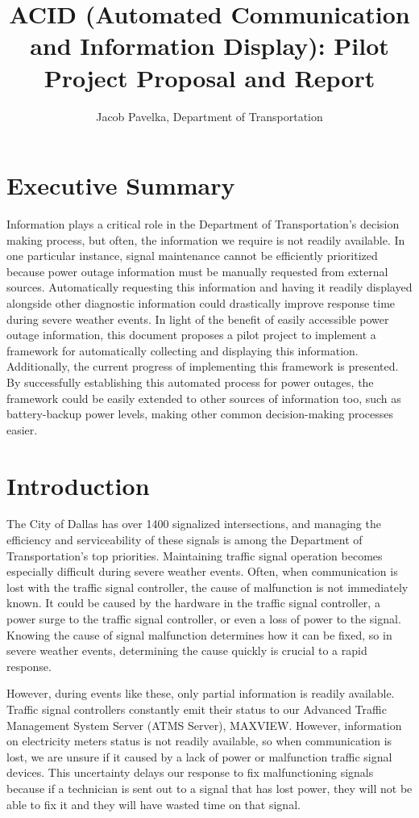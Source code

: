 \documentclass[]{amsldoc}
\title{ACID (Automated Communication and Information Display): Pilot Project Proposal and Report}
\author{Jacob Pavelka, Department of Transportation}
\begin{document}
\maketitle

\section{Executive Summary}

Information plays a critical role in the Department of Transportation's decision making process, but often, the information we require is not readily available. In one particular instance, signal maintenance cannot be efficiently prioritized because power outage information must be manually requested from external sources. Automatically requesting this information and having it readily displayed alongside other diagnostic information could drastically improve response time during severe weather events. In light of the benefit of easily accessible power outage information, this document proposes a pilot project to implement a framework for automatically collecting and displaying this information. Additionally, the current progress of implementing this framework is presented. By successfully establishing this automated process for power outages, the framework could be easily extended to other sources of information too, such as battery-backup power levels, making other common decision-making processes easier. 

\section{Introduction}

The City of Dallas has over 1400 signalized intersections, and managing the efficiency and serviceability of these signals is among the Department of Transportation's top priorities. Maintaining traffic signal operation becomes especially difficult during severe weather events. Often, when communication is lost with the traffic signal controller, the cause of malfunction is not immediately known. It could be caused by the hardware in the traffic signal controller, a power surge to the traffic signal controller, or even a loss of power to the signal. Knowing the cause of signal malfunction determines how it can be fixed, so in severe weather events, determining the cause quickly is crucial to a rapid response. 

However, during events like these, only partial information is readily available. Traffic signal controllers constantly emit their status to our Advanced Traffic Management System Server (ATMS Server), MAXVIEW. However, information on electricity meters status is not readily available, so when communication is lost, we are unsure if it caused by a lack of power or malfunction traffic signal devices. This uncertainty delays our response to fix malfunctioning signals because if a technician is sent out to a signal that has lost power, they will not be able to fix it and they will have wasted time on that signal.
\end{document}
